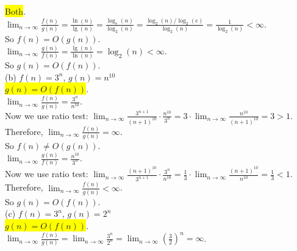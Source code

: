 \documentclass[12pt]{article}
\begin{document}
\colorbox{yellow}{Both}.\\

$\lim_{n \to \infty} \frac{f(n)}{g(n)} = \frac{\ln(n)}{\lg(n)} = \frac{\log_e(n)}{\log_2(n)} = \frac{\log_2(n)/\log_2(e)}{\log_2(n)} = \frac{1}{\log_2(n)} < \infty$.\\

So $f(n) = O(g(n))$.\\

$\lim_{n \to \infty} \frac{g(n)}{f(n)} = \frac{\lg(n)}{\ln(n)} = \log_2(n) < \infty$.\\

So $g(n) = O(f(n))$.\\

\noindent(b) $f(n) = 3^n$, $g(n) = n^{10}$\\

\colorbox{yellow}{$g(n) = O(f(n))$}.\\

$\lim_{n \to \infty} \frac{f(n)}{g(n)} = \frac{3^n}{n^{10}}$.\\

Now we use ratio test: $\lim_{n \to \infty} \frac{3^{n+1}}{(n+1)^{10}} \cdot \frac{n^{10}}{3^n} = 3 \cdot \lim_{n \to \infty} \frac{n^{10}}{(n+1)^{10}} = 3 > 1$.\\

Therefore, $\lim_{n \to \infty} \frac{f(n)}{g(n)} = \infty$.\\

So $f(n) \neq O(g(n))$.\\

$\lim_{n \to \infty} \frac{g(n)}{f(n)} = \frac{n^{10}}{3^n}$.\\

Now we use ratio test: $\lim_{n \to \infty} \frac{(n+1)^{10}}{3^{n+1}} \cdot \frac{3^n}{n^{10}} =  \frac{1}{3} \cdot \lim_{n \to \infty} \frac{(n+1)^{10}}{n^{10}} = \frac{1}{3} < 1$.\\

Therefore, $\lim_{n \to \infty} \frac{f(n)}{g(n)} < \infty$.\\

So $g(n) = O(f(n))$. \\

\noindent(c) $f(n) = 3^n$, $g(n) = 2^n$\\

\colorbox{yellow}{$g(n) = O(f(n))$}.\\

$\lim_{n \to \infty} \frac{f(n)}{g(n)} = \lim_{n \to \infty} \frac{3^n}{2^n} =  \lim_{n \to \infty} (\frac{3}{2})^n = \infty$.\\
\end{document}
